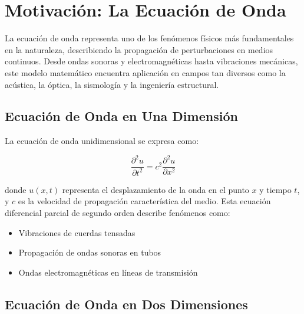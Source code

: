 \documentclass[a4paper]{article}
\begin{document}


\maketitle

\tableofcontents
\newpage

\section{Motivación: La Ecuación de Onda}

La ecuación de onda representa uno de los fenómenos físicos más fundamentales en la naturaleza, describiendo la propagación de perturbaciones en medios continuos. Desde ondas sonoras y electromagnéticas hasta vibraciones mecánicas, este modelo matemático encuentra aplicación en campos tan diversos como la acústica, la óptica, la sismología y la ingeniería estructural.

\subsection{Ecuación de Onda en Una Dimensión}

La ecuación de onda unidimensional se expresa como:

\begin{equation}
\frac{\partial^2 u}{\partial t^2} = c^2 \frac{\partial^2 u}{\partial x^2}
\end{equation}

donde $u(x,t)$ representa el desplazamiento de la onda en el punto $x$ y tiempo $t$, y $c$ es la velocidad de propagación característica del medio. Esta ecuación diferencial parcial de segundo orden describe fenómenos como:

\begin{itemize}
\item Vibraciones de cuerdas tensadas
\item Propagación de ondas sonoras en tubos
\item Ondas electromagnéticas en líneas de transmisión
\end{itemize}

\subsection{Ecuación de Onda en Dos Dimensiones}
\end{document}
